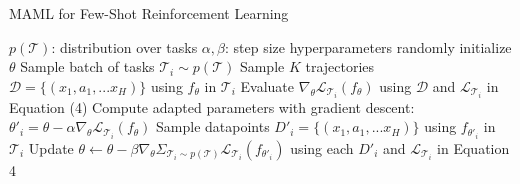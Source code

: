 \begin{algorithm}
    \caption{MAML for Few-Shot Reinforcement Learning}
    \label{MAML-reinforcement}
    \begin{algorithmic}[1]
        \REQUIRE $p(\mathcal{T})$: distribution over tasks
        \REQUIRE $\alpha, \beta$: step size hyperparameters
        \STATE randomly initialize $\theta$
        \STATE Sample batch of tasks $\mathcal{T}_i \sim p(\mathcal{T})$
        \STATE Sample $K$ trajectories $\mathcal{D}=\{(x_1,a_1,...x_H)\}$ using $f_\theta$ in $\mathcal{T}_i$
        \STATE Evaluate $\nabla_\theta \mathcal{L}_{\mathcal{T}_i} (f_\theta)$ using $\mathcal{D}$ and $\mathcal{L}_{\mathcal{T}_i}$ in Equation (4)
        \STATE Compute adapted parameters with gradient descent: $\theta'_i = \theta - \alpha\nabla_\theta \mathcal{L}_{\mathcal{T}_i} (f_\theta)$
        \STATE Sample datapoints $D'_i=\{(x_1,a_1,...x_H)\}$ using $f_{\theta'_i}$ in $\mathcal{T}_i$
        \ENDFOR
        \STATE Update $\theta \leftarrow \theta - \beta\nabla_\theta \Sigma_{\mathcal{T}_i \sim p(\mathcal{T})}\mathcal{L}_{\mathcal{T}_i} (f_{\theta'_i})$  using each $D'_i$ and $\mathcal{L}_{\mathcal{T}_i} $ in Equation 4
        \ENDWHILE
    \end{algorithmic}
\end{algorithm}



